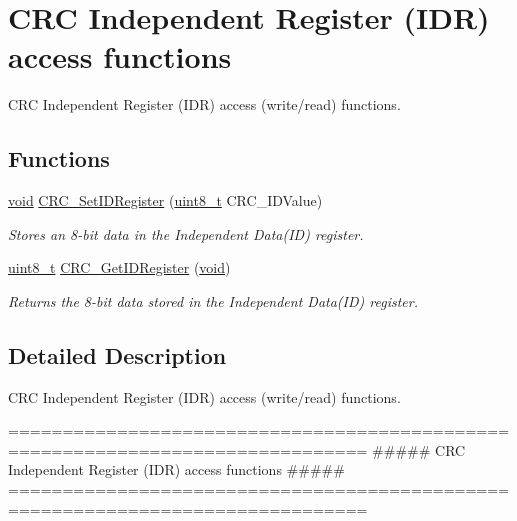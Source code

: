\hypertarget{group___c_r_c___group3}{\section{C\-R\-C Independent Register (I\-D\-R) access functions}
\label{group___c_r_c___group3}
}


C\-R\-C Independent Register (I\-D\-R) access (write/read) functions.  


\subsection*{Functions}
\begin{DoxyCompactItemize}
\item 
\hyperlink{group___n_a_m_e_ga18028b8badbf1ea7e704ccac3c488e82}{void} \hyperlink{group___c_r_c___group3_gaf375649920fb3a1cf57af17116443802}{C\-R\-C\-\_\-\-Set\-I\-D\-Register} (\hyperlink{stdint_8h_aba7bc1797add20fe3efdf37ced1182c5}{uint8\-\_\-t} C\-R\-C\-\_\-\-I\-D\-Value)
\begin{DoxyCompactList}\small\item\em Stores an 8-\/bit data in the Independent Data(\-I\-D) register. \end{DoxyCompactList}\item 
\hyperlink{stdint_8h_aba7bc1797add20fe3efdf37ced1182c5}{uint8\-\_\-t} \hyperlink{group___c_r_c___group3_gaf869f6e9c3ca0ae0822cfad1abea7e5f}{C\-R\-C\-\_\-\-Get\-I\-D\-Register} (\hyperlink{group___n_a_m_e_ga18028b8badbf1ea7e704ccac3c488e82}{void})
\begin{DoxyCompactList}\small\item\em Returns the 8-\/bit data stored in the Independent Data(\-I\-D) register. \end{DoxyCompactList}\end{DoxyCompactItemize}


\subsection{Detailed Description}
C\-R\-C Independent Register (I\-D\-R) access (write/read) functions. \begin{DoxyVerb} ===============================================================================
           ##### CRC Independent Register (IDR) access functions #####
 ===============================================================================\end{DoxyVerb}
 

